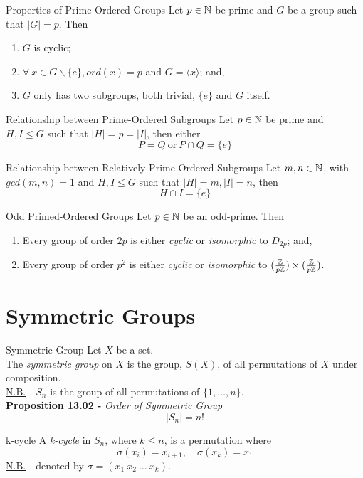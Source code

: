 \documentclass[11pt,a4paper]{article}
\begin{document}
\subtitle{Theorem 12.05 - }{Properties of Prime-Ordered Groups}
Let $p \in \mathbb{N}$ be prime and $G$ be a group such that $|G| = p$. Then
\begin{enumerate}[label=\roman*)]
  \item $G$ is cyclic;
  \item $\forall\ x \in G \backslash \{e\}, ord(x) = p$ and $G = \langle x \rangle$; and,
  \item $G$ only has two subgroups, both trivial, $\{e\}$ and $G$ itself.\\
\end{enumerate}

\subtitle{Proposition 12.06 - }{Relationship between Prime-Ordered Subgroups}
Let $p \in \mathbb{N}$ be prime and $H, I \leq G$ such that $|H| = p = |I|$, then either
$$P = Q \mathrm{\ or \ } P \cap Q = \{e\} $$

\subtitle{Proposition 12.07 - }{Relationship between Relatively-Prime-Ordered Subgroups}
Let $m, n \in \mathbb{N}$, with $gcd(m,n) = 1$ and $H, I \leq G$ such that $|H| = m, |I| = n$, then
$$H \cap I = \{e\}$$

\subtitle{Theorem 12.08 - }{Odd Primed-Ordered Groups}
Let $p \in \mathbb{N}$ be an odd-prime. Then
\begin{enumerate}[label=\roman*)]
  \item Every group of order $2p$ is either \textit{cyclic} or \textit{isomorphic} to $D_{2p}$; and,
  \item Every group of order $p^2$ is either \textit{cyclic} or \textit{isomorphic} to $(\frac{\mathbb{Z}}{p\mathbb{Z}}) \times (\frac{\mathbb{Z}}{p\mathbb{Z}})$.
\end{enumerate}

\section{Symmetric Groups}

\subtitle{Definition 13.01 - }{Symmetric Group}
Let $X$ be a set.\\
The \textit{symmetric group} on $X$ is the group, $S(X)$, of all permutations of $X$ under composition.\\
\underline{N.B.} - $S_n$ is the group of all permutations of $\{1 , \dots , n\}$.\\

\textbf{Proposition 13.02 - }\textit{Order of Symmetric Group}
$$|S_n| = n!$$

\subtitle{Definition 13.03 - }{k-cycle}
A \textit{k-cycle} in $S_n$, where $k \leq n$, is a permutation where
$$\sigma(x_i) = x_{i+1},\quad \sigma(x_k) = x_1$$
\underline{N.B.} - denoted by $\sigma = (x_1\ x_2\ \dots\ x_k)$.\\
\end{document}
